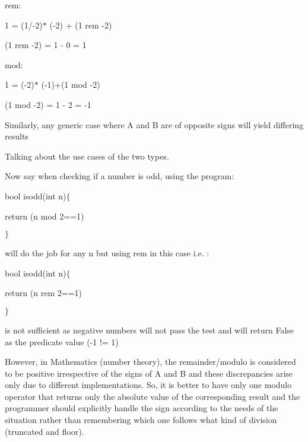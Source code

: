 \documentclass[12pt]{article}
\renewcommand{\_}{\kern-1.5pt\textunderscore\kern-1.5pt}
\begin{document}
\vspace{\baselineskip}
rem:\par

1 = (1/-2)$\ast$ (-2) + (1 rem -2)\par

(1 rem -2) = 1 - 0 = 1\par


\vspace{\baselineskip}
mod:\par

1 = (-2)$\ast$ (-1)+(1 mod -2)\par

(1 mod -2) = 1 - 2 = -1 \par


\vspace{\baselineskip}
Similarly, any generic case where A and B are of opposite signs will yield differing results\par


\vspace{\baselineskip}
Talking about the use cases of the two types.\par

Now say when checking if a number is odd, using the program:\par


\vspace{\baselineskip}
bool is\_odd(int n)$ \{ $ \par

\tab return (n mod 2==1)\par

$ \} $ \par

will do the job for any n but using rem in this case i.e. :\par

bool is\_odd(int n)$ \{ $ \par

\tab return (n rem 2==1)\par

$ \} $ \par

is not sufficient as negative numbers will not pass the test and will return False as the predicate value (-1 != 1)\par


\vspace{\baselineskip}
However, in Mathematics (number theory), the remainder/modulo is considered to be positive irrespective of the signs of A and B and these discrepancies arise only due to different implementations. So, it is better to have only one modulo operator that returns only the absolute value of the corresponding result and the programmer should explicitly handle the sign according to the needs of the situation rather than remembering which one follows what kind of division (truncated and floor).\par
\end{document}
